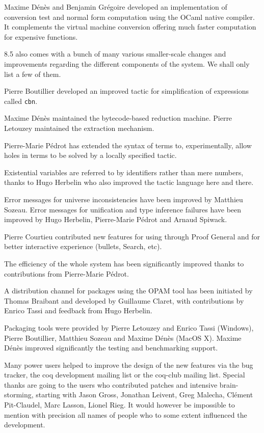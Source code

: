 Maxime Dénès and Benjamin Grégoire developed an implementation of
conversion test and normal form computation using the OCaml native
compiler. It complements the virtual machine conversion offering much
faster computation for expensive functions.

{\Coq} 8.5 also comes with a bunch of many various smaller-scale
changes and improvements regarding the different components of the
system. We shall only list a few of them.

Pierre Boutillier developed an improved tactic for simplification of
expressions called {\tt cbn}.

Maxime Dénès maintained the bytecode-based reduction machine. Pierre
Letouzey maintained the extraction mechanism.

Pierre-Marie Pédrot has extended the syntax of terms to,
experimentally, allow holes in terms to be solved by a locally
specified tactic.

Existential variables are referred to by identifiers rather than mere
numbers, thanks to Hugo Herbelin who also improved the tactic language
here and there.

Error messages for universe inconsistencies have been improved by
Matthieu Sozeau. Error messages for unification and type inference
failures have been improved by Hugo Herbelin, Pierre-Marie Pédrot and
Arnaud Spiwack.

Pierre Courtieu contributed new features for using {\Coq} through Proof
General and for better interactive experience (bullets, Search, etc).

The efficiency of the whole system has been significantly improved
thanks to contributions from Pierre-Marie Pédrot.

A distribution channel for {\Coq} packages using the OPAM tool has
been initiated by Thomas Braibant and developed by Guillaume Claret,
with contributions by Enrico Tassi and feedback from Hugo Herbelin.

Packaging tools were provided by Pierre Letouzey and Enrico Tassi
(Windows), Pierre Boutillier, Matthieu Sozeau and Maxime Dénès (MacOS
X). Maxime Dénès improved significantly the testing and benchmarking
support.

Many power users helped to improve the design of the new features via
the bug tracker, the coq development mailing list or the coq-club
mailing list. Special thanks are going to the users who contributed
patches and intensive brain-storming, starting with Jason Gross,
Jonathan Leivent, Greg Malecha, Clément Pit-Claudel, Marc Lasson,
Lionel Rieg. It would however be impossible to mention with precision
all names of people who to some extent influenced the development.

